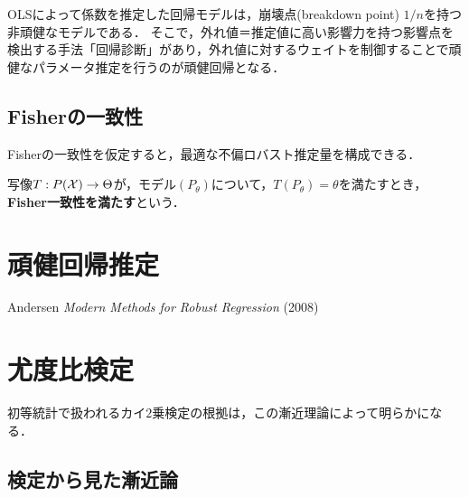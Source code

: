 \documentclass[uplatex,dvipdfmx]{jsreport}
\begin{document}
\begin{example}[]
    OLSによって係数を推定した回帰モデルは，崩壊点(breakdown point) $1/n$を持つ非頑健なモデルである．
    そこで，外れ値＝推定値に高い影響力を持つ影響点を検出する手法「回帰診断」があり，外れ値に対するウェイトを制御することで頑健なパラメータ推定を行うのが頑健回帰となる．
\end{example}

\subsection{Fisherの一致性}

\begin{tcolorbox}[colframe=ForestGreen, colback=ForestGreen!10!white,breakable,colbacktitle=ForestGreen!40!white,coltitle=black,fonttitle=\bfseries\sffamily,
title=]
    Fisherの一致性を仮定すると，最適な不偏ロバスト推定量を構成できる．
\end{tcolorbox}

\begin{definition}
    写像$T:P(\mathcal{X})\to\Theta$が，モデル$(P_\theta)$について，$T(P_\theta)=\theta$を満たすとき，\textbf{Fisher一致性を満たす}という．
\end{definition}

\section{頑健回帰推定}

\begin{tcolorbox}[colframe=ForestGreen, colback=ForestGreen!10!white,breakable,colbacktitle=ForestGreen!40!white,coltitle=black,fonttitle=\bfseries\sffamily,
title=]
    Andersen \textit{Modern Methods for Robust Regression} (2008)
    
\end{tcolorbox}

\section{尤度比検定}

\begin{tcolorbox}[colframe=ForestGreen, colback=ForestGreen!10!white,breakable,colbacktitle=ForestGreen!40!white,coltitle=black,fonttitle=\bfseries\sffamily,
title=]
    初等統計で扱われるカイ$2$乗検定の根拠は，この漸近理論によって明らかになる．
\end{tcolorbox}

\subsection{検定から見た漸近論}
\end{document}
